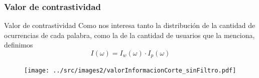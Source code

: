 \begin{frame}[t]\frametitle{Valor de contrastividad}
    \begin{block}{Valor de contrastividad}
    Como nos interesa tanto la distribución de la cantidad de ocurrencias de cada palabra, como la de la cantidad de usuarios que la menciona, definimos   
    \begin{equation}
    I(\omega) =  I_w (\omega) \cdot I_p(\omega)
    \label{eq:ivalor}
    \end{equation}
    \end{block}    




            \begin{figure}
            \centering
            \texttt{[image: ../src/images2/valorInformacionCorte\_sinFiltro.pdf]}
            \label{fig:ivalue}
            \end{figure}

    

\end{frame}

